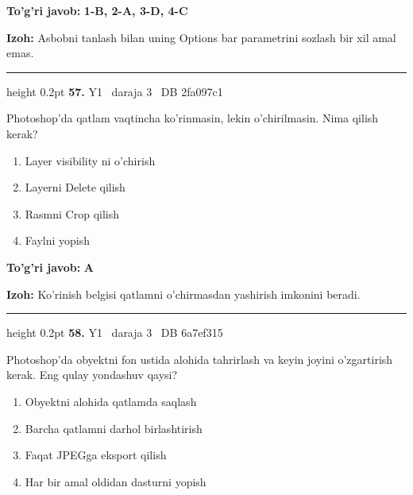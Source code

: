 \documentclass[10pt,a4paper,oneside]{article}
\begin{document}
\begin{tcolorbox}[enhanced,breakable,colback=teal!4,colframe=teal!45!black,boxrule=0.45pt,arc=1.2mm,left=2.8mm,right=2.8mm,top=2mm,bottom=2mm,before skip=2mm,after skip=2mm]
\textbf{\color{teal}To'g'ri javob:} \textbf{1-B, 2-A, 3-D, 4-C}
\par\smallskip
\textbf{Izoh:} Asbobni tanlash bilan uning Options bar parametrini sozlash bir xil amal emas.
\end{tcolorbox}
\vspace{2mm}\hrule height 0.2pt \vspace{4mm}
\hypertarget{q57}{\textbf{\color{ink}57.}}  {\color{muted}\scriptsize Y1 \textbullet\ daraja 3 \textbullet\ DB 2fa097c1}
\par
Photoshop'da qatlam vaqtincha ko'rinmasin, lekin o'chirilmasin. Nima qilish kerak?
\begin{enumerate}[label=\Alph*),leftmargin=9mm]
\item Layer visibility ni o'chirish
\item Layerni Delete qilish
\item Rasmni Crop qilish
\item Faylni yopish
\end{enumerate}
\begin{tcolorbox}[enhanced,breakable,colback=teal!4,colframe=teal!45!black,boxrule=0.45pt,arc=1.2mm,left=2.8mm,right=2.8mm,top=2mm,bottom=2mm,before skip=2mm,after skip=2mm]
\textbf{\color{teal}To'g'ri javob:} \textbf{A}
\par\smallskip
\textbf{Izoh:} Ko'rinish belgisi qatlamni o'chirmasdan yashirish imkonini beradi.
\end{tcolorbox}
\vspace{2mm}\hrule height 0.2pt \vspace{4mm}
\hypertarget{q58}{\textbf{\color{ink}58.}}  {\color{muted}\scriptsize Y1 \textbullet\ daraja 3 \textbullet\ DB 6a7ef315}
\par
Photoshop'da obyektni fon ustida alohida tahrirlash va keyin joyini o'zgartirish kerak. Eng qulay yondashuv qaysi?
\begin{enumerate}[label=\Alph*),leftmargin=9mm]
\item Obyektni alohida qatlamda saqlash
\item Barcha qatlamni darhol birlashtirish
\item Faqat JPEGga eksport qilish
\item Har bir amal oldidan dasturni yopish
\end{enumerate}
\end{document}
